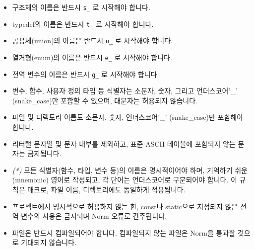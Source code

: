 \documentclass{42-ko}
\begin{document}
        \begin{itemize}

            \item 구조체의 이름은 반드시 \texttt{s\_} 로 시작해야 합니다.

            \item typedef의 이름은 반드시 \texttt{t\_} 로 시작해야 합니다.

            \item 공용체(union)의 이름은 반드시 \texttt{u\_} 로 시작해야 합니다.

            \item 열거형(enum)의 이름은 반드시 \texttt{e\_} 로 시작해야 합니다.

            \item 전역 변수의 이름은 반드시 \texttt{g\_} 로 시작해야 합니다.

            \item 변수, 함수, 사용자 정의 타입 등 식별자는 소문자, 숫자, 그리고
              언더스코어'\_' (snake\_case)만 포함할 수 있으며, 대문자는
              허용되지 않습니다.

            \item 파일 및 디렉토리 이름도 소문자, 숫자, 언더스코어'\_' (snake\_case)만
              포함해야 합니다.

            \item 리터럴 문자열 및 문자 내부를 제외하고, 표준 ASCII 테이블에
              포함되지 않는 문자는 금지됩니다.

            \item \textit{(*)} 모든 식별자(함수, 타입, 변수 등)의 이름은
              명시적이어야 하며, 기억하기 쉬운(mnemonic) 영어로 작성되고,
              각 단어는 언더스코어로 구분되어야 합니다. 이 규칙은 매크로, 파일 이름,
              디렉토리에도 동일하게 적용됩니다.

            \item 프로젝트에서 명시적으로 허용하지 않는 한, const나 static으로
              지정되지 않은 전역 변수의 사용은 금지되며 Norm 오류로 간주됩니다.

            \item 파일은 반드시 컴파일되어야 합니다. 컴파일되지 않는 파일은
              Norm을 통과할 것으로 기대되지 않습니다.
        \end{itemize}
\newpage

\end{document}
